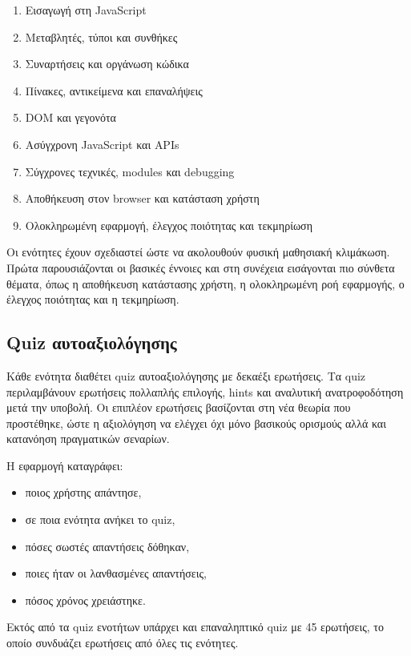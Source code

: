 \documentclass[a4paper]{article}
\newcommand{\textlatin}[1]{\textenglish{#1}}
\begin{document}
\begin{enumerate}[leftmargin=1.2cm]
  \item Εισαγωγή στη \textlatin{JavaScript}
  \item Μεταβλητές, τύποι και συνθήκες
  \item Συναρτήσεις και οργάνωση κώδικα
  \item Πίνακες, αντικείμενα και επαναλήψεις
  \item \textlatin{DOM} και γεγονότα
  \item Ασύγχρονη \textlatin{JavaScript} και \textlatin{APIs}
  \item Σύγχρονες τεχνικές, \textlatin{modules} και debugging
  \item Αποθήκευση στον browser και κατάσταση χρήστη
  \item Ολοκληρωμένη εφαρμογή, έλεγχος ποιότητας και τεκμηρίωση
\end{enumerate}

Οι ενότητες έχουν σχεδιαστεί ώστε να ακολουθούν φυσική μαθησιακή κλιμάκωση. Πρώτα παρουσιάζονται οι βασικές έννοιες και στη συνέχεια εισάγονται πιο σύνθετα θέματα, όπως η αποθήκευση κατάστασης χρήστη, η ολοκληρωμένη ροή εφαρμογής, ο έλεγχος ποιότητας και η τεκμηρίωση.

\subsection{Quiz αυτοαξιολόγησης}

Κάθε ενότητα διαθέτει quiz αυτοαξιολόγησης με δεκαέξι ερωτήσεις. Τα quiz περιλαμβάνουν ερωτήσεις πολλαπλής επιλογής, hints και αναλυτική ανατροφοδότηση μετά την υποβολή. Οι επιπλέον ερωτήσεις βασίζονται στη νέα θεωρία που προστέθηκε, ώστε η αξιολόγηση να ελέγχει όχι μόνο βασικούς ορισμούς αλλά και κατανόηση πραγματικών σεναρίων.

Η εφαρμογή καταγράφει:

\begin{itemize}[leftmargin=1.2cm]
  \item ποιος χρήστης απάντησε,
  \item σε ποια ενότητα ανήκει το quiz,
  \item πόσες σωστές απαντήσεις δόθηκαν,
  \item ποιες ήταν οι λανθασμένες απαντήσεις,
  \item πόσος χρόνος χρειάστηκε.
\end{itemize}

Εκτός από τα quiz ενοτήτων υπάρχει και επαναληπτικό quiz με 45 ερωτήσεις, το οποίο συνδυάζει ερωτήσεις από όλες τις ενότητες.
\end{document}
